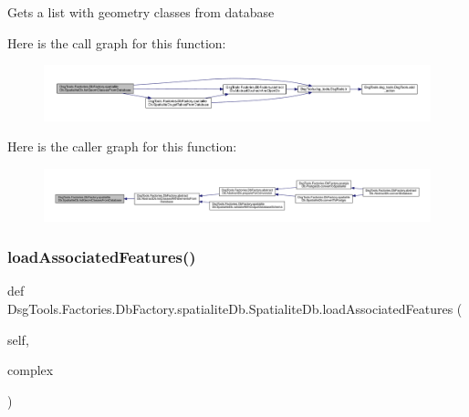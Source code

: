 \begin{DoxyVerb}Gets a list with geometry classes from database
\end{DoxyVerb}
 Here is the call graph for this function\+:
\nopagebreak
\begin{figure}[H]
\begin{center}
\leavevmode
\includegraphics[width=350pt]{class_dsg_tools_1_1_factories_1_1_db_factory_1_1spatialite_db_1_1_spatialite_db_a8d2a6e18a5af7a635035c71695f4faf8_cgraph}
\end{center}
\end{figure}
Here is the caller graph for this function\+:
\nopagebreak
\begin{figure}[H]
\begin{center}
\leavevmode
\includegraphics[width=350pt]{class_dsg_tools_1_1_factories_1_1_db_factory_1_1spatialite_db_1_1_spatialite_db_a8d2a6e18a5af7a635035c71695f4faf8_icgraph}
\end{center}
\end{figure}
\mbox{\label{class_dsg_tools_1_1_factories_1_1_db_factory_1_1spatialite_db_1_1_spatialite_db_a8dee410ae184376d36aceabc16ebe13c}} 
\subsubsection{\texorpdfstring{load\+Associated\+Features()}{loadAssociatedFeatures()}}
{\footnotesize\ttfamily def Dsg\+Tools.\+Factories.\+Db\+Factory.\+spatialite\+Db.\+Spatialite\+Db.\+load\+Associated\+Features (\begin{DoxyParamCaption}\item[{}]{self,  }\item[{}]{complex }\end{DoxyParamCaption})}

